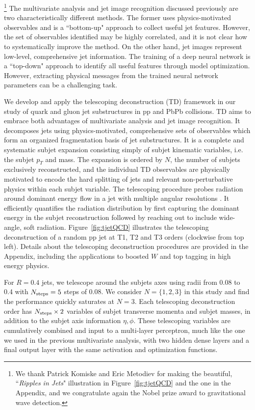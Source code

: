 \documentclass[notoc,preprintnumbers]{JHEP3}
\begin{document}
\footnote{We thank Patrick Komiske and Eric Metodiev for making the beautiful, ``{\sl Ripples in Jets}" illustration in Figure~\ref{fig:tjetQCD} and the one in the Appendix, and we congratulate again the Nobel prize award to gravitational wave detection.} The multivariate analysis and jet image recognition discussed previously are two characteristically different methods. The former uses physics-motivated observables and is a ``bottom-up" approach to collect useful jet features. However, the set of observables identified may be highly correlated, and it is not clear how to systematically improve the method. On the other hand, jet images represent low-level, comprehensive jet information. The training of a deep neural network is a ``top-down" approach to identify all useful features through model optimization. However, extracting physical messages from the trained neural network parameters can be a challenging task.

We develop and apply the telescoping deconstruction (TD) framework in our study of quark and gluon jet substructures in pp and PbPb collisions. TD aims to embrace both advantages of multivariate analysis and jet image recognition. It decomposes jets using physics-motivated, comprehensive sets of observables which form an organized fragmentation basis of jet substructures. It is a complete and systematic subjet expansion consisting simply of subjet kinematic variables, i.e. the subjet $p_T$ and mass. The expansion is ordered by $N$, the number of subjets exclusively reconstructed, and the individual TD observables are physically motivated to encode the hard splitting of jets and relevant non-perturbative physics within each subjet variable. The telescoping procedure probes radiation around dominant energy flow in a jet with multiple angular resolutions \cite{Chien:2013kca,Adams:2015hiv,Chien:2014hla,Chien:2017xrb}. It efficiently quantifies the radiation distribution by first capturing the dominant energy in the subjet reconstruction followed by reaching out to include wide-angle, soft radiation. Figure~\ref{fig:tjetQCD} illustrates the telescoping deconstruction of a random pp jet at T1, T2 and T3 orders (clockwise from top left). Details about the telescoping deconstruction procedures are provided in the Appendix, including the applications to boosted $W$ and top tagging in high energy physics.

For $R=0.4$ jets, we telescope around the subjets axes using radii from 0.08 to 0.4 with $N_{\rm steps} = 5$ steps of 0.08. We consider $N=\{1,2,3\}$ in this study and find the performance quickly saturates at $N=3$. Each telescoping deconstruction order has $N_{\rm steps} \times 2$ variables of subjet transverse momenta and subjet masses, in addition to the subjet axis information $\eta, \phi$. %
These telescoping variables are cumulatively combined and input to a multi-layer perceptron, much like the one we used in the previous multivariate analysis, with two hidden dense layers and a final output layer with the same activation and optimization functions.
\end{document}
